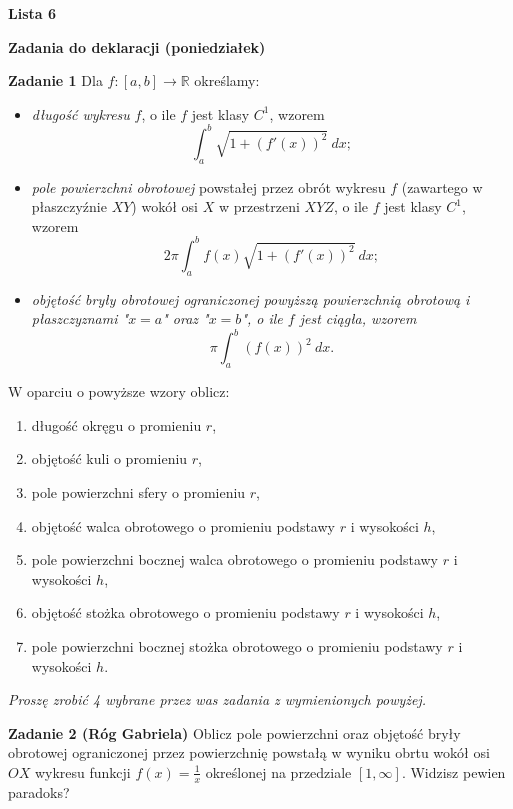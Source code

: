 \documentclass[a4paper,11pt]{article}
\begin{document}
\begin{center}
  {\large\textbf{Lista 6}}
\end{center}

\hrulefill
\begin{center}
    \textbf{Zadania do deklaracji (poniedziałek)}
\end{center}

\bigskip

\textbf{Zadanie 1} Dla $f:[a,b] \to \mathbb{R}$ określamy:

\begin{itemize}
    \item \textit{długość wykresu} $f$, o ile $f$ jest klasy $C^1$, wzorem 
    $$\int_a^b \sqrt{1+(f'(x))^2} ~dx;$$
    \item \textit{pole powierzchni obrotowej} powstałej przez obrót wykresu $f$ 
    (zawartego w płaszczyźnie $XY$) wokół osi $X$ w przestrzeni $XYZ$, 
    o ile $f$ jest klasy $C^1$, wzorem
    $$2\pi \int_a^b f(x) \sqrt{1+(f'(x))^2}~dx;$$
    \item \textit{objętość bryły obrotowej ograniczonej powyższą powierzchnią 
    obrotową i płaszczyznami "$x=a$" oraz "$x=b$", o ile $f$ jest ciągła, wzorem}
    $$\pi \int_a^b (f(x))^2 ~dx.$$
\end{itemize}

W oparciu o powyższe wzory oblicz:
\begin{enumerate}
    \item  długość okręgu o promieniu $r$,
    \item objętość kuli o promieniu $r$,
    \item pole powierzchni sfery o promieniu $r$,
    \item  objętość walca obrotowego o promieniu podstawy $r$ i wysokości $h$,
    \item pole powierzchni bocznej walca obrotowego o promieniu podstawy $r$ i wysokości $h$,
    \item objętość stożka obrotowego o promieniu podstawy $r$ i wysokości $h$,
    \item pole powierzchni bocznej stożka obrotowego o promieniu podstawy $r$ i wysokości $h$.
\end{enumerate}

\textit{Proszę zrobić 4 wybrane przez was zadania z wymienionych powyżej.} 

\bigskip

\hrulefill

\textbf{Zadanie 2 (Róg Gabriela)} Oblicz pole powierzchni oraz objętość
bryły obrotowej ograniczonej przez powierzchnię powstałą w wyniku obrtu
wokół osi $OX$ wykresu funkcji $f(x) = \frac{1}{x}$ określonej na
przedziale $[1,\infty]$. Widzisz pewien paradoks?
\end{document}
